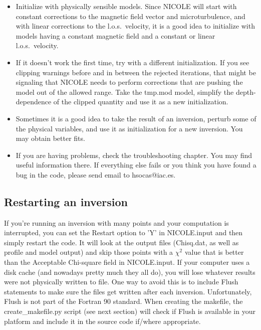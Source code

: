 \begin{itemize}
\item Initialize with physically sensible models. 
      Since NICOLE will start with constant corrections 
      to the magnetic field vector and microturbulence, 
      and with linear corrections to the l.o.s.\ velocity, 
      it is a good idea to initialize with models having 
      a constant magnetic field and a constant or 
      linear l.o.s.\ velocity.
\item If it doesn't work the first time, try with a different 
      initialization. If you see clipping warnings before and 
      in between the rejected iterations, that might be signaling that
      NICOLE needs to perform corrections that are pushing the model out 
      of the allowed range.
      Take the tmp.mod model, simplify the depth-dependence of the 
      clipped quantity and use it as a new 
      initialization.
\item Sometimes it is a good idea to take the result of an inversion, 
      perturb some of the physical variables, and use it as initialization 
      for a new inversion. You may obtain better fits.
\item If you are having problems, check the troubleshooting chapter. 
      You may find useful information there. If everything else fails 
      or you think you have found a bug in the code, please send email to
      \mbox{hsocas@iac.es}. 
\end{itemize}


\subsection{Restarting an inversion}
\label{sec:restarting}

If you're running an inversion with many points and your computation
is interrupted, you can set the Restart option to 'Y' in NICOLE.input and
then simply restart the code. It will look at the output files
(Chisq.dat, as well as profile and model output) and skip those points
with a $\chi^2$ value that is better than the Acceptable Chi-square
field in NICOLE.input. If your computer uses a disk cache (and
nowadays pretty much they all do), you will lose whatever results were
not physically written to file. One way to avoid this is to
include Flush statements to make sure the files get written after each
inversion. Unfortunately, Flush is not part of the Fortran 90
standard. When creating the makefile, the create\_makefile.py script
(see next section) will check if Flush is available in your platform
and include it in the source code if/where appropriate.

